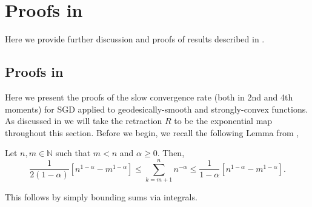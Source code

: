 \section{Proofs in } \label{sec:appapp}
Here we provide further discussion and proofs of results described in .
\subsection{Proofs in }
Here we present the proofs of the slow convergence rate (both in 2nd and 4th moments) for SGD applied to geodesically-smooth and strongly-convex functions. As discussed
in  we will take the retraction $R$ to be the exponential map throughout this section.
Before we begin, we recall the following Lemma from \citet{moulines2011non},
 \begin{lemma}\label{lem:computsum} Let $n,m\in\mathbb{N}$ such that $m<n$ and $\alpha\geq0$. Then,
\[
\frac{1}{2(1-\alpha)}[n^{1-\alpha}-m^{1-\alpha}]\leq \sum_{k=m+1}^n n^{-\alpha}\leq \frac{1}{1-\alpha}[n^{1-\alpha}-m^{1-\alpha}].
\]
\end{lemma}
This follows by simply bounding sums via integrals.

